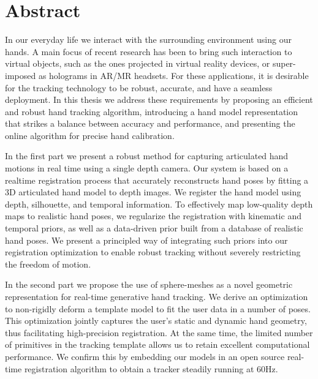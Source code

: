 
\chapter*{Abstract}

In our everyday life we interact with the surrounding environment using our hands. A main focus of recent research has been to bring such interaction to virtual objects, such as the ones projected in virtual reality devices, or super-imposed as holograms in AR/MR headsets. For these applications, it is desirable for the tracking technology to be robust, accurate, and have a seamless deployment. In this thesis we address these requirements by proposing an efficient and robust hand tracking algorithm, introducing a hand model representation that strikes a balance between accuracy and performance, and presenting the online algorithm for precise hand calibration.


In the first part we present a robust method for capturing articulated hand motions in real time using a single depth camera. Our system is based on a realtime registration process that accurately reconstructs hand poses by fitting a 3D articulated hand model to depth images. We register the hand model using depth, silhouette, and temporal information. To effectively map low-quality depth maps to realistic hand poses, we regularize the registration with kinematic and temporal priors, as well as a data-driven prior built from a database of realistic hand poses. We present a principled way of integrating such priors into our registration optimization to enable robust tracking without severely restricting the freedom of motion. 

In the second part we propose the use of sphere-meshes as a novel geometric representation for real-time generative hand tracking.  We derive an optimization to non-rigidly deform a template model to fit the user data in a number of poses. This optimization jointly captures the user's static and dynamic hand geometry, thus facilitating high-precision registration. At the same time, the limited number of primitives in the tracking template allows us to retain excellent computational performance. We confirm this by embedding our models in an open source real-time registration algorithm to obtain a tracker steadily running at 60Hz.

